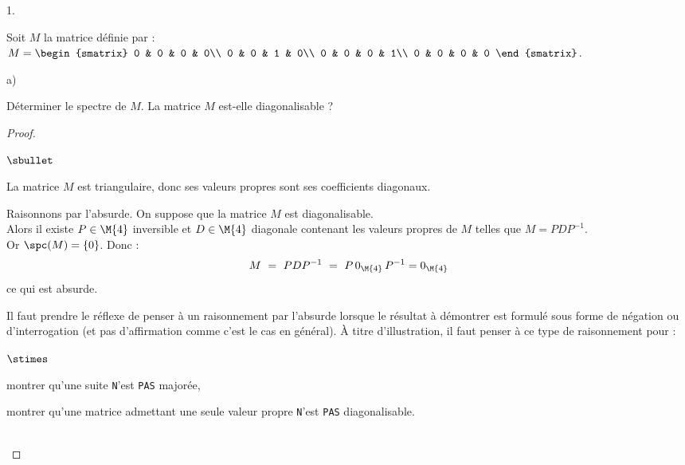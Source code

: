 \begin{noliste}{1.}
  \setlength{\itemsep}{4mm}
  \item Soit $M$ la matrice définie par : 
  $M = \begin{smatrix}
    0 & 0 & 0 & 0\\
    0 & 0 & 1 & 0\\
    0 & 0 & 0 & 1\\
    0 & 0 & 0 & 0
  \end{smatrix}$.
  \begin{noliste}{a)}
    \setlength{\itemsep}{2mm}
    \item Déterminer le spectre de $M$. La matrice $M$ est-elle 
    diagonalisable ?
    
    \begin{proof}~
      \begin{noliste}{$\sbullet$}
	\item La matrice $M$ est triangulaire, donc ses valeurs propres
	sont ses coefficients diagonaux.
	
	\item Raisonnons par l'absurde.
	On suppose que la matrice $M$ est diagonalisable.\\
	Alors il existe $P \in \M{4}$ inversible et $D \in \M{4}$ 
	diagonale contenant les valeurs propres de $M$ telles que 
	$M=PDP^{-1}$.\\
	Or $\spc(M)=\{0\}$. Donc :
	\[
	  M \ = \ PDP^{-1} \ = \ P \, 0_{\M{4}} \, P^{-1} = 0_{\M{4}}
	\]
	ce qui est absurde.
      \end{noliste}
      
      \begin{remark}
        Il faut prendre le réflexe de penser à un raisonnement par 
        l'absurde lorsque le résultat à démontrer est formulé sous 
        forme de négation ou d'interrogation (et pas d'affirmation 
        comme c'est le cas en général). À titre d'illustration, il 
        faut penser à ce type de raisonnement pour :
        \begin{noliste}{$\stimes$}
          \item montrer qu'une suite {\tt N}'est {\tt PAS} majorée,
          \item montrer qu'une matrice admettant une seule valeur
          propre {\tt N}'est {\tt PAS} diagonalisable.
        \end{noliste}
      \end{remark}~\\[-1.4cm]
    \end{proof}


\end{noliste}
\end{noliste}
